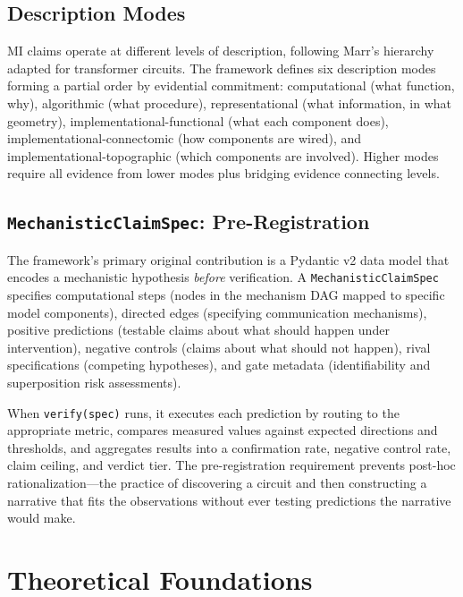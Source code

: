 \documentclass[10pt]{article}
\begin{document}
\subsection{Description Modes}
\label{sec:description-modes}

MI claims operate at different levels of description, following Marr's hierarchy adapted for transformer circuits. The framework defines six description modes forming a partial order by evidential commitment: computational (what function, why), algorithmic (what procedure), representational (what information, in what geometry), implementational-functional (what each component does), implementational-connectomic (how components are wired), and implementational-topographic (which components are involved). Higher modes require all evidence from lower modes plus bridging evidence connecting levels.

\subsection{\texttt{MechanisticClaimSpec}: Pre-Registration}
\label{sec:claimspec}

The framework's primary original contribution is a Pydantic v2 data model that encodes a mechanistic hypothesis \emph{before} verification. A \texttt{MechanisticClaimSpec} specifies computational steps (nodes in the mechanism DAG mapped to specific model components), directed edges (specifying communication mechanisms), positive predictions (testable claims about what should happen under intervention), negative controls (claims about what should not happen), rival specifications (competing hypotheses), and gate metadata (identifiability and superposition risk assessments).

When \texttt{verify(spec)} runs, it executes each prediction by routing to the appropriate metric, compares measured values against expected directions and thresholds, and aggregates results into a confirmation rate, negative control rate, claim ceiling, and verdict tier. The pre-registration requirement prevents post-hoc rationalization---the practice of discovering a circuit and then constructing a narrative that fits the observations without ever testing predictions the narrative would make.

\section{Theoretical Foundations}
\label{sec:foundations}
\end{document}
